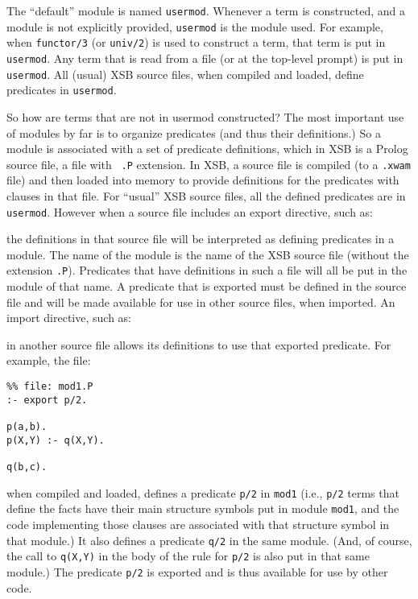 The ``default'' module is named {\tt usermod}.  Whenever a term is
constructed, and a module is not explicitly provided, {\tt usermod} is
the module used.  For example, when {\tt functor/3} (or {\tt univ/2})
is used to construct a term, that term is put in {\tt usermod}.  Any
term that is read from a file (or at the top-level prompt) is put in
{\tt usermod}.  All (usual) XSB source files, when compiled and
loaded, define predicates in {\tt usermod}.

So how are terms that are not in usermod constructed?  The most
important use of modules by far is to organize predicates (and thus
their definitions.)  So a module is associated with a set of predicate
definitions, which in XSB is a Prolog source file, a file with {\tt
  .P} extension.  In XSB, a source file is compiled (to a {\tt .xwam}
file) and then loaded into memory to provide definitions for the
predicates with clauses in that file.  For ``usual'' XSB source files,
all the defined predicates are in {\tt usermod}.  However when a
source file includes an export directive, such as:


\noindent the definitions in that source file will be interpreted as
defining predicates in a module.  The name of the module is the name
of the XSB source file (without the extension {\tt .P}).  Predicates
that have definitions in such a file will all be put in the module of
that name.  A predicate that is exported must be defined in the
source file and will be made available for use in other source files,
when imported.  An import directive, such as:


\noindent in another source file allows its definitions to use that
exported predicate.  For example, the file:
\begin{verbatim}
%% file: mod1.P
:- export p/2.

p(a,b).
p(X,Y) :- q(X,Y).

q(b,c).
\end{verbatim}
when compiled and loaded, defines a predicate {\tt p/2} in {\tt mod1}
(i.e., {\tt p/2} terms that define the facts have their main structure
symbols put in module {\tt mod1}, and the code implementing those
clauses are associated with that structure symbol in that module.)  It
also defines a predicate {\tt q/2} in the same module.  (And, of
course, the call to {\tt q(X,Y)} in the body of the rule for {\tt p/2}
is also put in that same module.)  The predicate {\tt p/2} is exported
and is thus available for use by other code.

